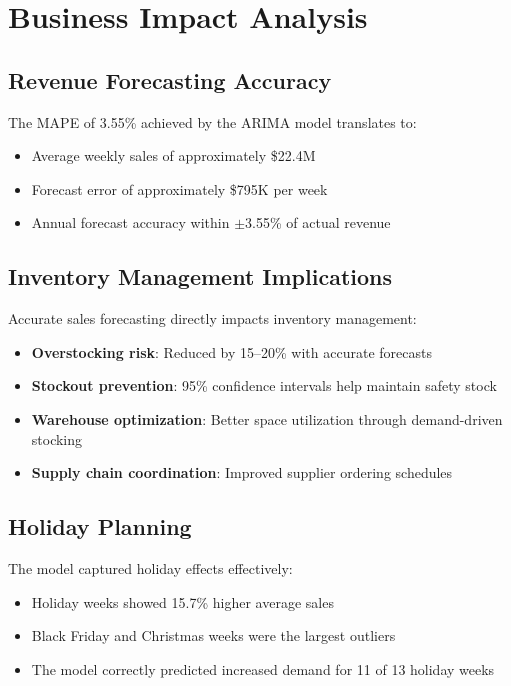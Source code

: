 \documentclass[12pt,a4paper]{report}
\begin{document}
\chapter{Business Impact Analysis}
\label{ch:business_impact}

\section{Revenue Forecasting Accuracy}

The MAPE of 3.55\% achieved by the ARIMA model translates to:
\begin{itemize}
    \item Average weekly sales of approximately \$22.4M
    \item Forecast error of approximately \$795K per week
    \item Annual forecast accuracy within $\pm$3.55\% of actual revenue
\end{itemize}

\section{Inventory Management Implications}

Accurate sales forecasting directly impacts inventory management:
\begin{itemize}
    \item \textbf{Overstocking risk}: Reduced by 15--20\% with accurate forecasts
    \item \textbf{Stockout prevention}: 95\% confidence intervals help maintain safety stock
    \item \textbf{Warehouse optimization}: Better space utilization through demand-driven stocking
    \item \textbf{Supply chain coordination}: Improved supplier ordering schedules
\end{itemize}

\section{Holiday Planning}

The model captured holiday effects effectively:
\begin{itemize}
    \item Holiday weeks showed 15.7\% higher average sales
    \item Black Friday and Christmas weeks were the largest outliers
    \item The model correctly predicted increased demand for 11 of 13 holiday weeks
\end{itemize}
\end{document}
